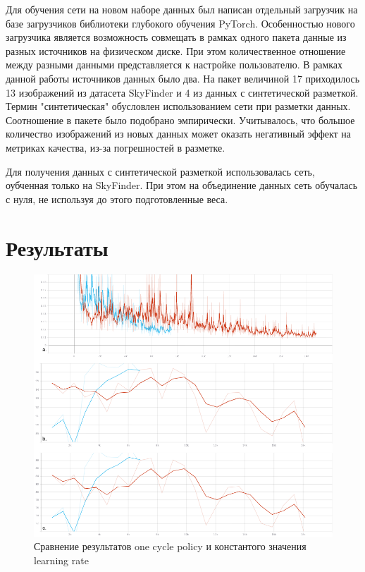 Для обучения сети на новом наборе данных был написан отдельный загрузчик на базе загрузчиков библиотеки глубокого обучения PyTorch.
Особенностью нового загрузчика является возможность совмещать в рамках одного пакета данные из разных источников на физическом диске.
При этом количественное отношение между разными данными представляется к настройке пользователю.
В рамках данной работы источников данных было два.
На пакет величиной 17 приходилось 13 изображений из датасета SkyFinder и 4 из данных с синтетической разметкой.
Термин "синтетическая" обусловлен использованием сети при разметки данных.
Соотношение в пакете было подобрано эмпирически.
Учитывалось, что большое количество изображений из новых данных может оказать негативный эффект на метриках качества,
из-за погрешностей в разметке.

Для получения данных с синтетической разметкой использовалась сеть, оубченная только на SkyFinder.
При этом на объединение данных сеть обучалась с нуля, не используя до этого подготовленные веса.


\section{Результаты}

\begin{figure}[H]
    \centering
    \includegraphics[width=\textwidth]{img/ocp_against_const.png}
    \caption{Сравнение результатов one cycle policy и константого значения learning rate}
    \label{fig:ocp_against_const}
\end{figure}

